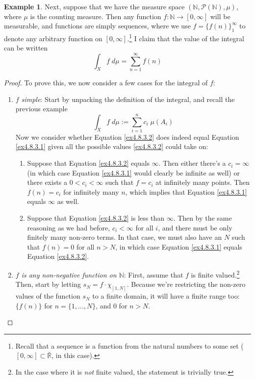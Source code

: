 \documentclass[12pt]{article}
\theoremstyle{plain}
\theoremstyle{definition}
\newtheorem{ex}[thm]{Example}
\theoremstyle{remark}
\begin{document}
\begin{ex}
    Next, suppose that we have the measure space $(\mathbb{N},\mathscr{P}(\mathbb{N}), \mu)$, where $\mu$ is the counting measure. Then any function $f: \mathbb{N}\rightarrow[0,\infty]$  will be measurable, and functions are simply sequences, where we use $f=\{f(n)\}_1^\infty$ to denote any arbitrary function on $[0,\infty]$.\footnote{Recall that a sequence is a function from the natural numbers to some set ($[0,\infty]\subset\bar{\mathbb{R}}$, in this case).} I claim that the value of the integral can be written 
\begin{equation}
    \int_X f \; d\mu = \sum^\infty_{n=1}f(n) 
    \label{ex4.8.3.1}
\end{equation}
\begin{proof}
To prove this, we now consider a few cases for the integral of $f$:
\begin{enumerate}
    \item {\sl $f$ simple}: Start by unpacking the definition of the integral, and recall the previous example
    \begin{equation}
        \label{ex4.8.3.2}
        \int_X f \; d\mu := \sum^n_{i=1} c_i \; \mu(A_i)
    \end{equation}
    Now we consider whether Equation \ref{ex4.8.3.2} does indeed equal Equation \ref{ex4.8.3.1} given all the possible values \ref{ex4.8.3.2} could take on:
    \begin{enumerate}
        \item Suppose that Equation \ref{ex4.8.3.2} equals $\infty$. Then either there's a $c_i=\infty$ (in which case Equation \ref{ex4.8.3.1} would clearly be infinite as well) or there exists a $0< c_i<\infty$ such that $f = c_i$ at infinitely many points. Then $f(n)=c_i$ for infinitely many $n$, which implies that Equation \ref{ex4.8.3.1} equals $\infty$ as well.
        \item Suppose that Equation \ref{ex4.8.3.2} is less than $\infty$. Then by the same reasoning as we had before, $c_i<\infty$ for all $i$, and there must be only finitely many non-zero terms. In that case, we must also have an $N$ such that $f(n)=0$ for all $n>N$, in which case Equation \ref{ex4.8.3.1} equals Equation \ref{ex4.8.3.2}.
    \end{enumerate}

\item {\sl $f$ is any non-negative function on $\mathbb{N}$}: First, assume that $f$ is finite valued.\footnote{In the case where it is \emph{not} finite valued, the statement is trivially true.}  Then, start by letting $s_N = f\cdot\chi_{[1,N]}$. Because we're restricting the non-zero values of the function $s_N$ to a finite domain, it will have a finite range too: $\{f(n)\}$ for $n=\{1,\ldots,N\}$, and 0 for $n>N$. 
    

\end{enumerate}
\end{proof}
\end{ex}
\end{document}

